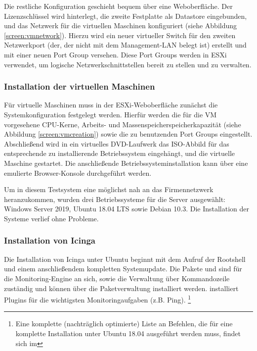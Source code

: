 Die restliche Konfiguration geschieht bequem über eine Weboberfläche. Der Lizenzschlüssel wird hinterlegt, die zweite Festplatte als Datastore eingebunden, und das Netzwerk für die virtuellen Maschinen konfiguriert (siehe Abbildung \ref{screen:vmnetwork}). Hierzu wird ein neuer virtueller Switch für den zweiten Netzwerkport (der, der nicht mit dem Management-LAN belegt ist) erstellt und mit einer neuen Port Group versehen. Diese Port Groups werden in ESXi verwendet, um logische Netzwerkschnittstellen bereit zu stellen und zu verwalten. 

\subsubsection{Installation der virtuellen Maschinen}
\label{sec:InstallationVMs}
Für virtuelle Maschinen muss in der ESXi-Weboberfläche zunächst die Systemkonfiguration festgelegt werden. Hierfür werden die für die VM vorgesehene CPU-Kerne, Arbeits- und Massenspeicherspeicherkapazität (siehe Abbildung \ref{screen:vmcreation}) sowie die zu benutzenden Port Groups eingestellt. Abschließend wird in ein virtuelles DVD-Laufwerk das ISO-Abbild für das entsprechende zu installierende Betriebssystem eingehängt, und die virtuelle Maschine gestartet. Die anschließende Betriebssysteminstallation kann über eine emulierte Browser-Konsole durchgeführt werden.

Um in diesem Testsystem eine möglichst nah an das Firmennetzwerk heranzukommen, wurden drei Betriebssysteme für die Server ausgewählt: Windows Server 2019, Ubuntu 18.04 LTS sowie Debian 10.3. Die Installation der Systeme verlief ohne Probleme.

\subsubsection{Installation von \glqq{}Icinga\grqq{}}
\label{sec:InstallationIcinga}
Die Installation von \glqq{}Icinga\grqq{} unter Ubuntu beginnt mit dem Aufruf der Rootshell und einem anschließendem kompletten Systemupdate. Die Pakete  und  sind für die Monitoring-Engine an sich, sowie die Verwaltung über Kommandozeile zuständig und können über die Paketverwaltung installiert werden.  installiert Plugins für die wichtigsten Monitoringaufgaben (z.B. Ping).
\footnote{Eine komplette (nachträglich optimierte) Liste an Befehlen, die für eine komplette Installation unter Ubuntu 18.04 ausgeführt werden muss, findet sich im }

